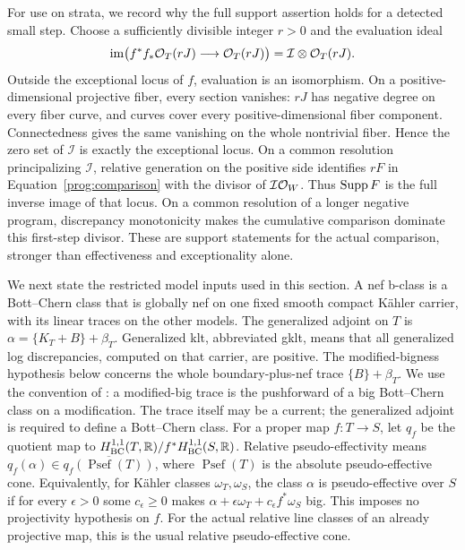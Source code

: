 For use on strata, we record why the full support assertion holds
for a detected small step. Choose a sufficiently divisible integer
\(r>0\) and the evaluation ideal
\[
 \operatorname{im}\bigl(f^*f_*\mathcal O_T(rJ)\longrightarrow\mathcal O_T(rJ)\bigr)
          =\mathcal I\otimes\mathcal O_T(rJ).
\]
Outside the exceptional locus of \(f\), evaluation is an isomorphism.
On a positive-dimensional projective fiber, every section vanishes:
\(rJ\) has negative degree on every fiber curve, and curves cover
every positive-dimensional fiber component. Connectedness gives the
same vanishing on the whole nontrivial fiber. Hence the zero set of
\(\mathcal I\) is exactly the exceptional locus. On a common
resolution principalizing \(\mathcal I\), relative generation on
the positive side identifies \(rF\) in
Equation~\eqref{prog:comparison} with the divisor of
\(\mathcal I\mathcal O_W\). Thus \(\operatorname{Supp} F\) is the full inverse image
of that locus. On a common resolution of a longer negative program,
discrepancy monotonicity makes the cumulative comparison dominate
this first-step divisor. These are support statements for the actual
comparison, stronger than effectiveness and exceptionality alone.

We next state the restricted model inputs used in this section. A nef
b-class is a Bott--Chern class that is globally nef on one fixed smooth
compact Kähler carrier, with its linear traces on the other models. The
generalized adjoint on \(T\) is
\(\alpha=\{K_T+B\}+\beta_T\). Generalized klt, abbreviated gklt,
means that all generalized log discrepancies, computed on that carrier,
are positive. The modified-bigness hypothesis below concerns the whole
boundary-plus-nef trace \(\{B\}+\beta_T\). We use the convention of
\cite[Definition~2.8]{HX}: a modified-big trace is the pushforward of
a big Bott--Chern class on a modification. The trace itself may be
a current; the generalized adjoint is required to define a
Bott--Chern class.
For a proper map $f:T\to S$, let $q_f$ be the quotient map to
$H^{1,1}_{\mathrm{BC}}(T,\mathbb R)/f^*H^{1,1}_{\mathrm{BC}}(S,\mathbb R)$. Relative
pseudo-effectivity means
$q_f(\alpha)\in\overline{q_f(\operatorname{Psef}(T))}$, where
$\operatorname{Psef}(T)$ is the absolute pseudo-effective cone.
Equivalently, for Kähler classes $\omega_T,\omega_S$, the class
$\alpha$ is pseudo-effective over $S$ if for every $\epsilon>0$
some $c_\epsilon\geq0$ makes
$\alpha+\epsilon\omega_T+c_\epsilon f^*\omega_S$ big.
This imposes no projectivity hypothesis on $f$. For the actual
relative line classes of an already projective map, this is the
usual relative pseudo-effective cone.


